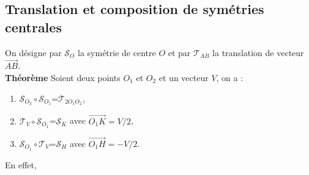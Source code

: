 \documentclass[a4paper,11pt]{book}
\begin{document}
\subsection{Translation et composition de sym\'etries centrales}
On d\'esigne par $\mathcal S_O$ la sym\'etrie de centre $O$ et par 
$\mathcal T_{AB}$ la translation de vecteur $\overrightarrow {AB}$.\\
{\bf Th\'eor\`eme}
Soient deux points $O_1$ et $O_2$ et un vecteur $V$, on a :
\begin{enumerate}
\item $\mathcal S_{O_2} \circ \mathcal S_{O_1}$=$\mathcal T_{2O_1O_2}$,
\item $\mathcal T_V\circ \mathcal S_{O_1}$=$\mathcal S_{K}$ avec 
$\overrightarrow {O_1K}=V/2$,
\item $\mathcal S_{O_1}\circ \mathcal T_V$=$\mathcal S_{H}$ avec 
$\overrightarrow {O_1H}=-V/2$.
\end{enumerate}
En effet,
\end{document}
